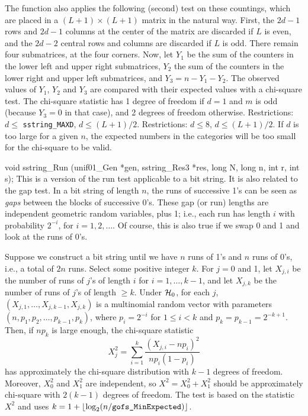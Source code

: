   The function also applies the following (second) test on these countings,
  which are placed in a $(L+1)\times(L+1)$ matrix in the natural way.
  First, the  $2d-1$ rows and $2d-1$  columns at the center of the matrix
  are discarded if $L$ is even, and the $2d-2$ central rows and columns
  are discarded if $L$ is odd.
  There remain four submatrices, at the four corners.
  Now, let $Y_1$ be the sum of the counters in the lower left and
  upper right submatrices, $Y_2$ the sum of the counters in the
  lower right and upper left submatrices, and $Y_3 = n - Y_1 - Y_2$.
  The observed values of $Y_1$, $Y_2$  and $Y_3$ are compared with their
  expected values with a chi-square test.
  The chi-square statistic has 1 degree of freedom if $d=1$ and $m$ is odd
   (because $Y_3=0$ in that case),  and 2 degrees of freedom otherwise.
\ifdetailed
  Restrictions:   $d \le $ {\tt sstring\_MAXD}, $d \le (L + 1)/2$.
\else
  Restrictions:   $d \le 8$, $d \le (L + 1)/2$.
\fi
  If $d$ is too large for a given $n$, the expected numbers in the
   categories will be too small for the chi-square to be valid.
  \endtab
\code


void sstring_Run (unif01_Gen *gen, sstring_Res3 *res,
                  long N, long n, int r, int s);
\endcode
 \tab  This is a version of the run test applicable to a bit string.
  It is also related to the gap test.
  In a bit string of length $n$, the runs of successive 1's can be seen
  as {\em gaps\/} between the blocks of successive 0's.
  These gap (or run) lengths are independent geometric random variables,
  plus 1; i.e., each run has length $i$ with probability $2^{-i}$,
  for $i=1,2,\dots$.  Of course, this is also true if we swap 0 and 1
  and look at the runs of 0's.

  Suppose we construct a bit string until we have $n$ runs of 1's and
  $n$ runs of 0's, i.e., a total of $2n$ runs.
  Select some positive integer $k$.
  For $j=0$ and 1, let $X_{j,i}$ be the number of runs of $j$'s of
  length $i$ for $i = 1,\dots,k-1$, and let $X_{j,k}$
  be the number of runs of $j$'s of length $\ge k$.
  Under $\mathcal{H}_0$, for each $j$, $(X_{j,1},\dots,X_{j,k-1},X_{j,k})$
  is a multinomial random vector with parameters
  $(n, p_1, p_2, \dots, p_{k-1}, p_k)$, where
  $p_i = 2^{-i}$ for $1\le i < k$ and $p_k = p_{k-1} = 2^{-k+1}$.
  Then, if $n p_k$ is large enough, the chi-square statistic
$$
  X_j^2 = \sum_{i=1}^k \frac{(X_{j,i} - n p_i)^2}{n p_i(1-p_i)}
$$
  has approximately the chi-square distribution with $k-1$ degrees
  of freedom.
  Moreover, $X_0^2$ and $X_1^2$ are independent,
  so $X^2 = X_0^2 + X_1^2$ should be approximately chi-square with
  $2(k-1)$ degrees of freedom.
  The test is based on the statistic $X^2$ and uses
  $k = 1 + \lfloor \log_2 (n / \mbox{\tt gofs\_MinExpected}) \rfloor$.

